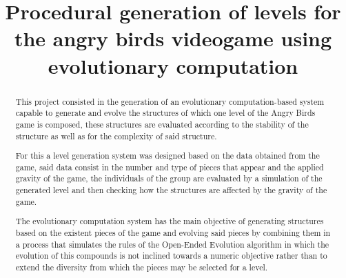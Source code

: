 \documentclass[conference]{IEEEtran}
\begin{document}
\title{Procedural generation of levels for the angry birds videogame using
evolutionary computation\\
}

\author{
\and
{} 
\and
{} }

\maketitle

\begin{abstract}
This project consisted in the generation of an evolutionary computation-based
system capable to generate and evolve the structures of which one level of the
Angry Birds game is composed, these structures are evaluated according to the
stability of the structure as well as for the complexity of said structure.

For this a level generation system was designed based on the data obtained from
the game, said data consist in the number and type of pieces that appear and the
applied gravity of the game, the individuals of the group are evaluated by a
simulation of the generated level and then checking how the structures are
affected by the gravity of the game.  %

The evolutionary computation system has the main objective of generating
structures based on the existent pieces of the game and evolving said pieces by
combining them in a process that simulates the rules of the Open-Ended Evolution
algorithm in which the evolution of this compounds is not inclined towards a
numeric objective rather than to extend the diversity from which the pieces may
be selected for a level.

\end{abstract}
\end{document}
